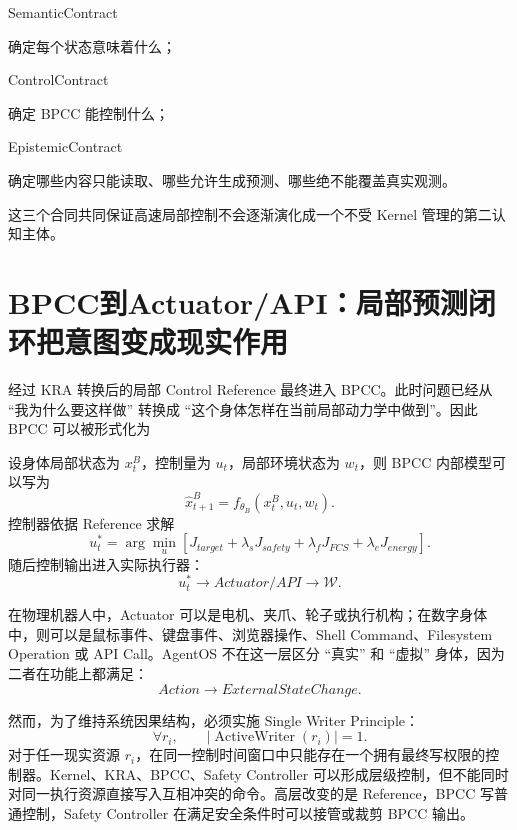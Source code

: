 \begin{statementbox}
SemanticContract
\end{statementbox}
确定每个状态意味着什么；

\begin{statementbox}
ControlContract
\end{statementbox}
确定 BPCC 能控制什么；

\begin{statementbox}
EpistemicContract
\end{statementbox}
确定哪些内容只能读取、哪些允许生成预测、哪些绝不能覆盖真实观测。

这三个合同共同保证高速局部控制不会逐渐演化成一个不受 Kernel 管理的第二认知主体。


\section{BPCC到Actuator/API：局部预测闭环把意图变成现实作用}

经过 KRA 转换后的局部 Control Reference 最终进入 BPCC。此时问题已经从 ``我为什么要这样做'' 转换成 ``这个身体怎样在当前局部动力学中做到''。因此 BPCC 可以被形式化为
\begin{statementbox}
\centering
{}
\end{statementbox}

设身体局部状态为 $x^B_t$，控制量为 $u_t$，局部环境状态为 $w_t$，则 BPCC 内部模型可以写为
\[
\hat x^B_{t+1}
=
f_{\theta_B}
\left(
x^B_t,
u_t,
w_t
\right).
\]
控制器依据 Reference 求解
\[
u_t^*
=
\arg\min_{u}
\left[
J_{target}
+
\lambda_sJ_{safety}
+
\lambda_fJ_{FCS}
+
\lambda_eJ_{energy}
\right].
\]
随后控制输出进入实际执行器：
\[
u_t^*
\rightarrow
Actuator/API
\rightarrow
\mathcal W .
\]

在物理机器人中，Actuator 可以是电机、夹爪、轮子或执行机构；在数字身体中，则可以是鼠标事件、键盘事件、浏览器操作、Shell Command、Filesystem Operation 或 API Call。AgentOS 不在这一层区分 ``真实'' 和 ``虚拟'' 身体，因为二者在功能上都满足：
\[
Action
\rightarrow
ExternalStateChange .
\]

然而，为了维持系统因果结构，必须实施 Single Writer Principle：
\[
\boxed{
\forall r_i,\qquad
|\operatorname{ActiveWriter}(r_i)|=1 .
}
\]
对于任一现实资源 $r_i$，在同一控制时间窗口中只能存在一个拥有最终写权限的控制器。Kernel、KRA、BPCC、Safety Controller 可以形成层级控制，但不能同时对同一执行资源直接写入互相冲突的命令。高层改变的是 Reference，BPCC 写普通控制，Safety Controller 在满足安全条件时可以接管或裁剪 BPCC 输出。

